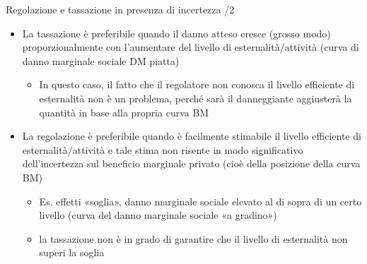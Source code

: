 \documentclass[aspectratio=64,11pt]{beamer}
\begin{document}
\begin{frame}{Regolazione e tassazione in presenza di incertezza /2}
\begin{itemize}
\item \alert{La tassazione è preferibile} quando il danno atteso cresce (grosso modo)
proporzionalmente con l'aumentare del livello di esternalità/attività (curva
di danno marginale sociale DM piatta)
\begin{itemize}
\item In questo caso, il fatto che il regolatore non conosca il livello
efficiente di esternalità non è un problema, perché sarà il danneggiante
aggiusterà la quantità in base alla propria curva BM
\end{itemize}

\item \alert{La regolazione è preferibile} quando è facilmente stimabile il livello
efficiente di esternalità/attività e tale stima non risente in modo
significativo dell'incertezza sul beneficio marginale privato (cioè della
posizione della curva BM)
\begin{itemize}
\item Es. effetti «soglia», danno marginale sociale elevato al di sopra di un
certo livello (curva del danno marginale sociale «a gradino»)
\item la tassazione non è in grado di garantire che il livello di esternalità
non superi la soglia
\end{itemize}
\end{itemize}
\end{frame}
\end{document}
